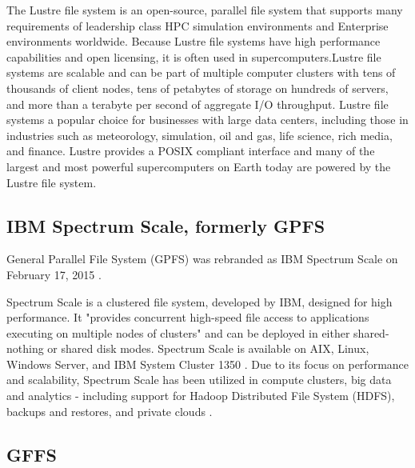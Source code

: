      The Lustre file system \cite{www-lustre} is an open-source,
     parallel file system that supports many requirements of
     leadership class HPC simulation environments and Enterprise
     environments worldwide. Because Lustre file systems have high
     performance capabilities and open licensing, it is often used in
     supercomputers.Lustre file systems are scalable and can be part
     of multiple computer clusters with tens of thousands of client
     nodes, tens of petabytes of storage on hundreds of servers, and
     more than a terabyte per second of aggregate I/O
     throughput. Lustre file systems a popular choice for businesses
     with large data centers, including those in industries such as
     meteorology, simulation, oil and gas, life science, rich media,
     and finance. Lustre provides a POSIX compliant interface and many
     of the largest and most powerful supercomputers on Earth today
     are powered by the Lustre file system.
     
\subsection{IBM Spectrum Scale, formerly GPFS}

     General Parallel File System (GPFS) was rebranded as IBM Spectrum 
     Scale on February 17, 2015 \cite{www-wikigpfs}.

     Spectrum Scale is a clustered file system, developed by IBM,
     designed for high performance. It "provides concurrent high-speed
     file access to applications executing on multiple nodes of
     clusters" \cite{www-wikigpfs} and can be deployed in either
     shared-nothing or shared disk modes. Spectrum Scale is available
     on AIX, Linux, Windows Server, and IBM System Cluster 1350
     \cite{www-wikigpfs}.  Due to its focus on performance and
     scalability, Spectrum Scale has been utilized in compute
     clusters, big data and analytics - including support for Hadoop
     Distributed File System (HDFS), backups and restores, and private
     clouds \cite{www-spectrumscale}.

\subsection{GFFS}

